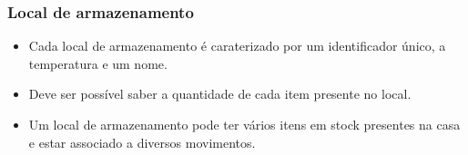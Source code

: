 \subsubsection{Local de armazenamento}
\begin{itemize}
	\item Cada local de armazenamento é caraterizado por um identificador único, a temperatura e um nome.
	\item Deve ser possível saber a quantidade de cada item presente no local.
	\item Um local de armazenamento pode ter vários itens em stock presentes na casa e estar associado a diversos movimentos.
\end{itemize}